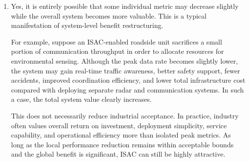 \begin{enumerate}[label=\textbf{\arabic*.}, leftmargin=*]
    Vehicular networks are promising because they require both communication and environmental awareness, have high safety value, and can benefit strongly from closed-loop coordination. The low-altitude economy is also attractive because UAV supervision demands wide-area sensing, connectivity, and rapid deployment. Industrial automation has high willingness to pay, relatively controlled environments, and clear business value for integrated sensing and communication.

    From the perspective of the four dimensions:
    \begin{itemize}
        \item \textbf{Spectrum efficiency:} these scenarios can benefit from avoiding separate spectrum usage for sensing and communication.
        \item \textbf{Hardware cost:} shared infrastructure reduces duplication.
        \item \textbf{Deployment efficiency:} these applications often require fast and scalable rollout.
        \item \textbf{Business closed-loop capability:} all three scenarios naturally require perception--decision--control loops.
    \end{itemize}

    Among them, industrial automation may be the earliest to mature commercially because industrial settings are more controllable and the return on investment may be easier to demonstrate. However, vehicular and low-altitude scenarios may drive broader public-scale deployment.

    \item 
    Yes, it is entirely possible that some individual metric may decrease slightly while the overall system becomes more valuable. This is a typical manifestation of system-level benefit restructuring.

    For example, suppose an ISAC-enabled roadside unit sacrifices a small portion of communication throughput in order to allocate resources for environmental sensing. Although the peak data rate becomes slightly lower, the system may gain real-time traffic awareness, better safety support, fewer accidents, improved coordination efficiency, and lower total infrastructure cost compared with deploying separate radar and communication systems. In such a case, the total system value clearly increases.

    This does not necessarily reduce industrial acceptance. In practice, industry often values overall return on investment, deployment simplicity, service capability, and operational efficiency more than isolated peak metrics. As long as the local performance reduction remains within acceptable bounds and the global benefit is significant, ISAC can still be highly attractive.

\end{enumerate}